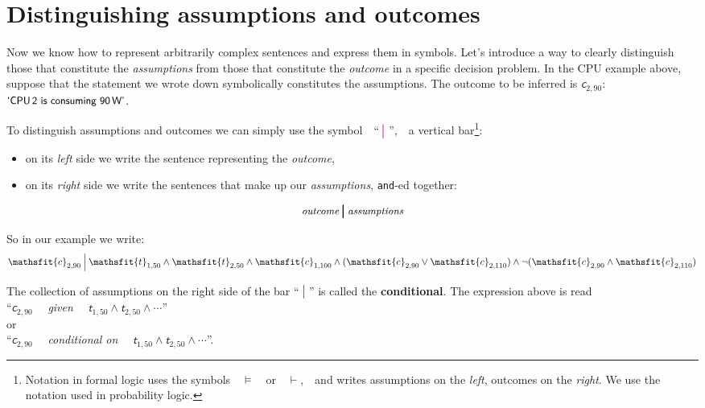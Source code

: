 \documentclass[
  a4paper,
  DIV=11,
  numbers=noendperiod,
  oneside]{scrreprt}
\providecommand{\tightlist}{%
  \setlength{\itemsep}{0pt}\setlength{\parskip}{0pt}}\usepackage{longtable,booktabs,array}
\begin{document}
\hypertarget{distinguishing-assumptions-and-outcomes}{%
\section{Distinguishing assumptions and
outcomes}\label{distinguishing-assumptions-and-outcomes}}

Now we know how to represent arbitrarily complex sentences and express
them in symbols. Let's introduce a way to clearly distinguish those that
constitute the \emph{assumptions} from those that constitute the
\emph{outcome} in a specific decision problem. In the CPU example above,
suppose that the statement we wrote down symbolically constitutes the
assumptions. The outcome to be inferred is
\(\mathsfit{c}_{2,90}\):~~\(\textsf{\small`CPU\,2 is consuming 90\,W'}\).

To distinguish assumptions and outcomes we can simply use the
symbol~~``\(\color[RGB]{238,102,119}\pmb{\nonscript\:\big\vert\nonscript\:\mathopen{}}\)'',~~a
vertical bar\footnote{Notation in formal logic uses the
  symbols~~\(\models\)~~or~~\(\vdash\),~~and writes assumptions on the
  \emph{left}, outcomes on the \emph{right}. We use the notation used in
  probability logic.}:

\begin{itemize}
\tightlist
\item
  on its \emph{left} side we write the sentence representing the
  \emph{outcome},
\item
  on its \emph{right} side we write the sentences that make up our
  \emph{assumptions}, \texttt{and}-ed together:
\end{itemize}

\[
\textit{\small outcome} \pmb{\nonscript\:\big\vert\nonscript\:\mathopen{}} \textit{\small assumptions}
\]

So in our example we write: \[
\mathsfit{c}_{2,90} \nonscript\:\Big\vert\nonscript\:\mathopen{}
\mathsfit{t}_{1,50} \land \mathsfit{t}_{2,50}
\land \mathsfit{c}_{1,100}
\land (\mathsfit{c}_{2,90} \lor \mathsfit{c}_{2,110})
\land
\lnot(\mathsfit{c}_{2,90} \land \mathsfit{c}_{2,110})
\]

The collection of assumptions on the right side of the bar
``\(\nonscript\:\big\vert\nonscript\:\mathopen{}\)'' is called the
{\textbf{conditional}}. The expression above is read\\
``\(\mathsfit{c}_{2,90}\)~~ \emph{given}~~
\(\mathsfit{t}_{1,50} \land \mathsfit{t}_{2,50} \land\dotsb\)''\\
or\\
``\(\mathsfit{c}_{2,90}\)~~ \emph{conditional on}~~
\(\mathsfit{t}_{1,50} \land \mathsfit{t}_{2,50} \land\dotsb\)''.
\end{document}
